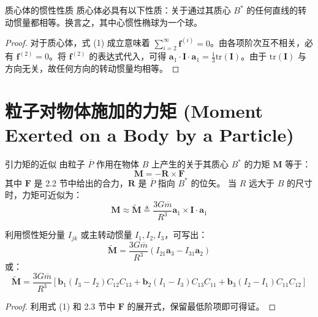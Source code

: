\begin{myTheorem}{质心体的惯性性质}
质心体必具有以下性质：关于通过其质心 \(B^*\) 的任何直线的转动惯量都相等。换言之，其中心惯性椭球为一个球。
\end{myTheorem}
\begin{proof}
对于质心体，式 (1) 成立意味着 \(\sum_{i=2}^\infty \mathbf{f}^{(i)} = 0\)。由各项阶次互不相关，必有 \(\mathbf{f}^{(2)} = 0\)。将 \(\mathbf{f}^{(2)}\) 的表达式代入，可得 \(\mathbf{a}_1 \cdot \mathbf{I} \cdot \mathbf{a}_1 = \frac{1}{3}\mathrm{tr}(\mathbf{I})\)。由于 \(\mathrm{tr}(\mathbf{I})\) 与方向无关，故任何方向的转动惯量均相等。
\end{proof}

\section{粒子对物体施加的力矩 (Moment Exerted on a Body by a Particle)}

\begin{myTheorem}{引力矩的近似}
由粒子 \(\overline{P}\) 作用在物体 \(B\) 上产生的关于其质心 \(B^*\) 的力矩 \(\mathbf{M}\) 等于：
\begin{equation}
\mathbf{M} = -\mathbf{R}\times\mathbf{F} \tag{1}
\end{equation}
其中 \(\mathbf{F}\) 是 2.2 节中给出的合力，\(\mathbf{R}\) 是 \(\overline{P}\) 指向 \(B^*\) 的位矢。
当 \(R\) 远大于 \(B\) 的尺寸时，力矩可近似为：
\begin{equation}
\mathbf{M} \approx \widetilde{\mathbf{M}} \triangleq \frac{3G\overline{m}}{R^3}\mathbf{a}_1\times\mathbf{I}\cdot\mathbf{a}_1 \tag{3}
\end{equation}
\end{myTheorem}

利用惯性矩分量 \(I_{jk}\) 或主转动惯量 \(I_1,I_2,I_3\)，可写出：
\begin{equation}
\widetilde{\mathbf{M}} = \frac{3G\overline{m}}{R^3}(I_{21}\mathbf{a}_3 - I_{31}\mathbf{a}_2) \tag{5}
\end{equation}
或：
\begin{equation}
\widetilde{\mathbf{M}} = \frac{3G\overline{m}}{R^3} \left[ \mathbf{b}_1 (I_3 - I_2)C_{12}C_{13} + \mathbf{b}_2 (I_1 - I_3)C_{13}C_{11} + \mathbf{b}_3 (I_2 - I_1)C_{11}C_{12} \right] \tag{8}
\end{equation}
\begin{proof}
利用式 (1) 和 2.3 节中 \(\mathbf{F}\) 的展开式，保留最低阶项即可得证。
\end{proof}

